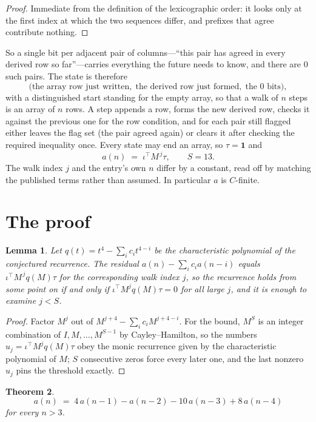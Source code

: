 \documentclass[11pt,a4paper]{article}
\theoremstyle{plain}
\newtheorem{theorem}{Theorem}
\newtheorem{lemma}[theorem]{Lemma}
\theoremstyle{definition}
\begin{document}
\begin{proof}
Immediate from the definition of the lexicographic order: it looks only at the first index at
which the two sequences differ, and prefixes that agree contribute nothing.
\end{proof}

So a single bit per adjacent pair of columns---``this pair has agreed in every derived row so
far''---carries everything the future needs to know, and there are $0$ such pairs. The state
is therefore
\[
\bigl(\text{the array row just written},\; \text{the derived row just formed},\;
\text{the 0 bits}\bigr),
\]
with a distinguished start standing for the empty array, so that a walk of $n$ steps is an array
of $n$ rows. A step appends a row, forms the new derived row, checks it against the previous one
for the row condition, and for each pair still flagged either leaves the flag set (the pair
agreed again) or clears it after checking the required inequality once. Every state may end an
array, so $\tau=\mathbf{1}$ and
\[
a(n)\;=\;\iota^{\!\top}M^{\,j}\tau ,\qquad S=13.
\]
The walk index $j$ and the entry's own $n$ differ by a constant, read off by matching the
published terms rather than assumed. In particular $a$ is $C$-finite.

\section{The proof}

\begin{lemma}\label{lem:crit}
Let $q(t)=t^{4}-\sum_i c_it^{4-i}$ be the characteristic polynomial of the
conjectured recurrence. The residual $a(n)-\sum_ic_ia(n-i)$ equals
$\iota^{\!\top}M^{\,j}q(M)\tau$ for the corresponding walk index $j$, so the recurrence
holds from some point on if and only if $\iota^{\!\top}M^{j}q(M)\tau=0$ for all large $j$,
and it is enough to examine $j<S$.
\end{lemma}

\begin{proof}
Factor $M^{j}$ out of $M^{j+4}-\sum_ic_iM^{j+4-i}$. For the bound, $M^{S}$
is an integer combination of $I,M,\dots,M^{S-1}$ by Cayley--Hamilton, so the numbers
$u_j=\iota^{\!\top}M^{j}q(M)\tau$ obey the monic recurrence given by the characteristic
polynomial of $M$; $S$ consecutive zeros force every later one, and the last nonzero $u_j$
pins the threshold exactly.
\end{proof}

\begin{theorem}
\[
a(n)\;=\;4\,a(n-1) - a(n-2) - 10\,a(n-3) + 8\,a(n-4)
\]
for every $n>3$.
\end{theorem}
\end{document}
